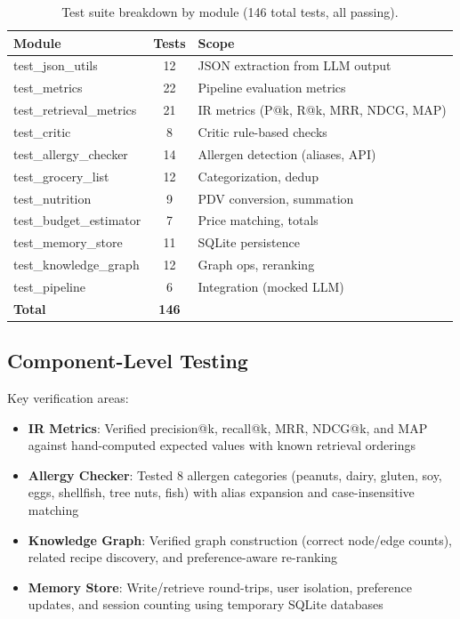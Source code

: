 \documentclass[11pt,twocolumn]{article}
\begin{document}
\begin{table}[H]
\centering
\caption{Test suite breakdown by module (146 total tests, all passing).}
\label{tab:tests}
\small
\begin{tabular}{@{}lcp{4cm}@{}}
\toprule
\textbf{Module} & \textbf{Tests} & \textbf{Scope} \\
\midrule
test\_json\_utils & 12 & JSON extraction from LLM output \\
test\_metrics & 22 & Pipeline evaluation metrics \\
test\_retrieval\_metrics & 21 & IR metrics (P@k, R@k, MRR, NDCG, MAP) \\
test\_critic & 8 & Critic rule-based checks \\
test\_allergy\_checker & 14 & Allergen detection (aliases, API) \\
test\_grocery\_list & 12 & Categorization, dedup \\
test\_nutrition & 9 & PDV conversion, summation \\
test\_budget\_estimator & 7 & Price matching, totals \\
test\_memory\_store & 11 & SQLite persistence \\
test\_knowledge\_graph & 12 & Graph ops, reranking \\
test\_pipeline & 6 & Integration (mocked LLM) \\
\midrule
\textbf{Total} & \textbf{146} & \\
\bottomrule
\end{tabular}
\end{table}

\subsection{Component-Level Testing}

Key verification areas:
\begin{itemize}[nosep]
    \item \textbf{IR Metrics}: Verified precision@k, recall@k, MRR, NDCG@k, and MAP against hand-computed expected values with known retrieval orderings
    \item \textbf{Allergy Checker}: Tested 8 allergen categories (peanuts, dairy, gluten, soy, eggs, shellfish, tree nuts, fish) with alias expansion and case-insensitive matching
    \item \textbf{Knowledge Graph}: Verified graph construction (correct node/edge counts), related recipe discovery, and preference-aware re-ranking
    \item \textbf{Memory Store}: Write/retrieve round-trips, user isolation, preference updates, and session counting using temporary SQLite databases
\end{itemize}
\end{document}
